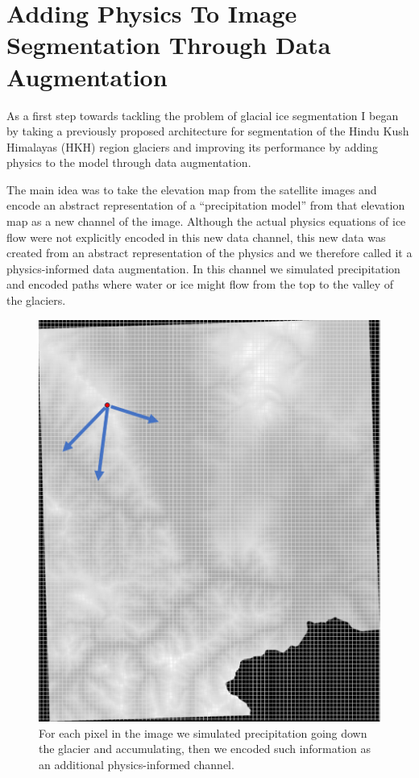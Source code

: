 \section{Adding Physics To Image Segmentation Through Data Augmentation}
As a first step towards tackling the problem of glacial ice segmentation I began by taking a previously proposed architecture for segmentation of the Hindu Kush Himalayas (HKH) region glaciers \cite{Bibek2023} and improving its performance by adding physics to the model through data augmentation. 

The main idea was to take the elevation map from the satellite images and encode an abstract representation of a ``precipitation model'' from that elevation map as a new channel of the image. Although the actual physics equations of ice flow were not explicitly encoded in this new data channel, this new data was created from an abstract representation of the physics and we therefore called it a physics-informed data augmentation. In this channel we simulated precipitation and encoded paths where water or ice might flow from the top to the valley of the glaciers.

\begin{figure}[H] \centering
    \includegraphics[width=\linewidth]{figures/data_augmentation_bfs.png}
    \caption{For each pixel in the image we simulated precipitation going down the glacier and accumulating, then we encoded such information as an additional physics-informed channel.}
    \label{fig:data_augmentation_bfs}
\end{figure}

